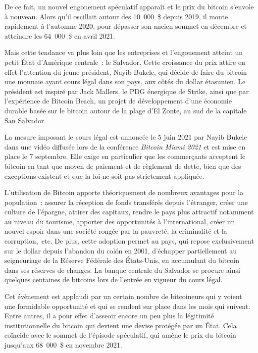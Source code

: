 De ce fait, un nouvel engouement spéculatif apparaît et le prix du bitcoin s'envole à nouveau. Alors qu'il oscillait autour des 10~000~\$ depuis 2019, il monte rapidement à l'automne 2020, pour dépasser son ancien sommet en décembre et atteindre les 64~000~\$ en avril 2021.

Mais cette tendance va plus loin que les entreprises et l'engouement atteint un petit État d'Amérique centrale~: le Salvador. Cette croissance du prix attire en effet l'attention du jeune président, Nayib Bukele, qui décide de faire du bitcoin une monnaie ayant cours légal dans son pays, aux côtés du dollar étasunien. Le président est inspiré par Jack Mallers, le PDG énergique de Strike, ainsi que par l'expérience de Bitcoin Beach, un projet de développement d'une économie durable basée sur le bitcoin autour de la plage d'El Zonte, au sud de la capitale San Salvador.

La mesure imposant le cours légal est annoncée le 5 juin 2021 par Nayib Bukele dans une vidéo diffusée lors de la conférence \emph{Bitcoin Miami 2021} et est mise en place le 7 septembre. Elle exige en particulier que les commerçants acceptent le bitcoin en tant que moyen de paiement et de règlement de dette, bien que des exceptions existent et que la loi ne soit pas strictement appliquée.

L'utilisation de Bitcoin apporte théoriquement de nombreux avantages pour la population~: assurer la réception de fonds transférés depuis l'étranger, créer une culture de l'épargne, attirer des capitaux, rendre le pays plus attractif notamment au niveau du tourisme, apporter des opportunités à l'international, créer un nouvel espoir dans une société rongée par la pauvreté, la criminalité et la corruption,~etc. De plus, cette adoption permet au pays, qui repose exclusivement sur le dollar depuis l'abandon du colón en 2001, d'échapper partiellement au seigneuriage de la Réserve Fédérale des États-Unis, en accumulant du bitcoin dans ses réserves de changes. La banque centrale du Salvador se procure ainsi quelques centaines de bitcoins lors de l'entrée en vigueur du cours légal.

Cet évènement est applaudi par un certain nombre de bitcoineurs qui y voient une formidable opportunité et qui se rendent sur place dans les mois qui suivent. Entre autres, il a pour effet d'asseoir encore un peu plus la légitimité institutionnelle du bitcoin qui devient une devise protégée par un État. Cela coïncide avec le sommet de l'épisode spéculatif, qui amène le prix du bitcoin jusqu'aux 68~000~\$ en novembre 2021.

